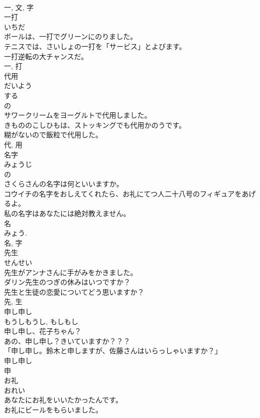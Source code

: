 \documentclass[8pt]{extreport}
\begin{document}
\begin{CJK}{UTF8}{min}
\\	一, 文, 字	
\\	一打	
\\	いちだ	
\\	ボールは、一打でグリーンにのりました。	
\\	テニスでは、さいしょの一打を「サービス」とよびます。	
\\	一打逆転の大チャンスだ。	
\\	一, 打	
\\	代用	
\\	だいよう	
\\	する 
\\	の 
\\	サワークリームをヨーグルトで代用しました。	
\\	きもののこしひもは、ストッキングでも代用かのうです。	
\\	糊がないので飯粒で代用した。	
\\	代, 用	
\\	名字	
\\	みょうじ	
\\	の 
\\	さくらさんの名字は何といいますか。	
\\	コウイチの名字をおしえてくれたら、お礼にてつ人二十八号のフィギュアをあげるよ。	
\\	私の名字はあなたには絶対教えません。	
\\	名 
\\	みょう. 
\\	名, 字	
\\	先生	
\\	せんせい	
\\	先生がアンナさんに手がみをかきました。	
\\	ダリン先生のつぎの休みはいつですか？	
\\	先生と生徒の恋愛についてどう思いますか？	
\\	先, 生	
\\	申し申し	
\\	もうしもうし, もしもし	
\\	申し申し、花子ちゃん？	
\\	あの、申し申し？きいていますか？？？	
\\	「申し申し。鈴木と申しますが、佐藤さんはいらっしゃいますか？」	
\\	申し申し 
\\	申	
\\	お礼	
\\	おれい	
\\	あなたにお礼をいいたかったんです。	
\\	お礼にビールをもらいました。	

\end{CJK}
\end{document}
